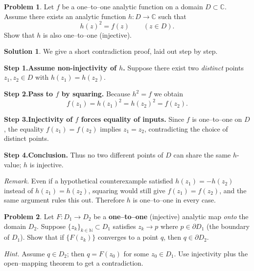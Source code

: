 \documentclass[12pt]{article}
\theoremstyle{definition} %
\newtheorem{solution}{Solution}
\newtheorem{problem}{Problem}
\theoremstyle{plain} %
\begin{document}
    \begin{problem}
      Let \(f\) be a one–to–one analytic function on a domain \(D\subset\mathbb{C}\).
      Assume there exists an analytic function \(h:D\to\mathbb{C}\) such that  
      \[
         h(z)^{2}=f(z)\qquad (z\in D).
      \]
      Show that \(h\) is also one–to–one (injective).
      \end{problem}
      
      \begin{solution}
      We give a short contradiction proof, laid out step by step.
      
      \medskip
      \textbf{Step 1.\;Assume non-injectivity of \(h\).}  
      Suppose there exist two \emph{distinct} points \(z_{1},z_{2}\in D\) with  
      \(h(z_{1})=h(z_{2})\).
      
      \smallskip
      \textbf{Step 2.\;Pass to \(f\) by squaring.}  
      Because \(h^{2}=f\) we obtain  
      \[
         f(z_{1})=h(z_{1})^{2}=h(z_{2})^{2}=f(z_{2}).
      \]
      
      \smallskip
      \textbf{Step 3.\;Injectivity of \(f\) forces equality of inputs.}  
      Since \(f\) is one–to–one on \(D\), the equality \(f(z_{1})=f(z_{2})\) implies  
      \(z_{1}=z_{2}\), contradicting the choice of distinct points.
      
      \smallskip
      \textbf{Step 4.\;Conclusion.}  
      Thus no two different points of \(D\) can share the same \(h\)-value;  
      \(h\) is injective.
      
      \medskip
      \emph{Remark.}  
      Even if a hypothetical counterexample satisfied \(h(z_{1})=-h(z_{2})\)
      instead of \(h(z_{1})=h(z_{2})\),
      squaring would still give \(f(z_{1})=f(z_{2})\),
      and the same argument rules this out.
      Therefore \(h\) is one–to–one in every case.
      \end{solution}
      \begin{problem}
        Let \(F:D_{1}\to D_{2}\) be a \textbf{one–to–one} (injective) analytic map
        \emph{onto} the domain \(D_{2}\).
        Suppose \(\{z_{k}\}_{k\in\mathbb N}\subset D_{1}\) satisfies
        \(z_{k}\longrightarrow p\) where 
        \(p\in\partial D_{1}\) (the boundary of \(D_{1}\)).
        Show that if \(\{F(z_{k})\}\) converges to a point \(q\), then  
        \(q\in\partial D_{2}\).
        
        \emph{Hint.}  Assume \(q\in D_{2}\); then \(q=F(z_{0})\) for some
        \(z_{0}\in D_{1}\).
        Use injectivity plus the open–mapping theorem to get a contradiction.
        \end{problem}
        
\end{document}
